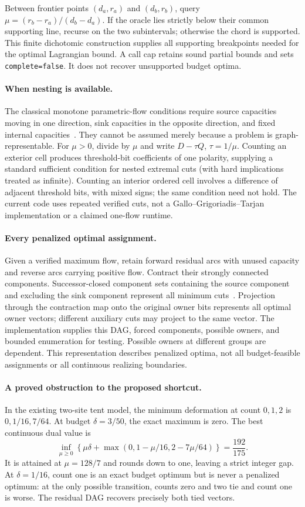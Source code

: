 \documentclass[11pt,letterpaper]{article}
\begin{document}
Between frontier points $(d_a,r_a)$ and $(d_b,r_b)$, query $\mu=(r_b-r_a)/(d_b-d_a)$. If the oracle lies strictly below their common supporting line, recurse on the two subintervals; otherwise the chord is supported. This finite dichotomic construction supplies all supporting breakpoints needed for the optimal Lagrangian bound. A call cap retains sound partial bounds and sets \texttt{complete=false}. It does not recover unsupported budget optima.

\paragraph{When nesting is available.}
The classical monotone parametric-flow conditions require source capacities moving in one direction, sink capacities in the opposite direction, and fixed internal capacities~\cite{ggt}. They cannot be assumed merely because a problem is graph-representable. For $\mu>0$, divide by $\mu$ and write $D-\tau Q$, $\tau=1/\mu$. Counting an exterior cell produces threshold-bit coefficients of one polarity, supplying a standard sufficient condition for nested extremal cuts (with hard implications treated as infinite). Counting an interior ordered cell involves a difference of adjacent threshold bits, with mixed signs; the same condition need not hold. The current code uses repeated verified cuts, not a Gallo--Grigoriadis--Tarjan implementation or a claimed one-flow runtime.

\paragraph{Every penalized optimal assignment.}
Given a verified maximum flow, retain forward residual arcs with unused capacity and reverse arcs carrying positive flow. Contract their strongly connected components. Successor-closed component sets containing the source component and excluding the sink component represent all minimum cuts~\cite{pq}. Projection through the contraction map onto the original owner bits represents all optimal owner vectors; different auxiliary cuts may project to the same vector. The implementation supplies this DAG, forced components, possible owners, and bounded enumeration for testing. Possible owners at different groups are dependent. This representation describes penalized optima, not all budget-feasible assignments or all continuous realizing boundaries.

\paragraph{A proved obstruction to the proposed shortcut.}
In the existing two-site tent model, the minimum deformation at count $0,1,2$ is $0,1/16,7/64$. At budget $\delta=3/50$, the exact maximum is zero. The best continuous dual value is
\[
 \inf_{\mu\ge0}\left\{\mu\delta+\max(0,1-\mu/16,2-7\mu/64)\right\}
 =\frac{192}{175}.
\]
It is attained at $\mu=128/7$ and rounds down to one, leaving a strict integer gap. At $\delta=1/16$, count one is an exact budget optimum but is never a penalized optimum: at the only possible transition, counts zero and two tie and count one is worse. The residual DAG recovers precisely both tied vectors.
\end{document}

